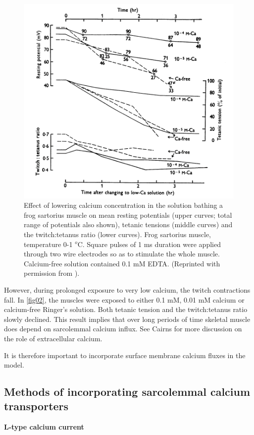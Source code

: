 \documentclass[fleqn,10pt]{physiome}
\begin{document}
\begin{figure}[ht!]
\centering
\includegraphics[width=0.7\linewidth]{fig02}
\caption{Effect of lowering calcium concentration in the solution bathing a frog sartorius muscle on mean resting potentials (upper curves; total range of potentials also shown), tetanic tensions (middle curves) and the twitch:tetanus ratio (lower curves). Frog sartorius muscle, temperature 0-1 $^{o}$C. Square pulses of 1 ms duration were applied through two wire electrodes so as to stimulate the whole muscle. Calcium-free solution contained 0.1 mM EDTA. 
(Reprinted with permission from \citet{edman1964role}).
}
\label{fig02}
\end{figure}

However, during prolonged exposure to very low calcium, the twitch contractions fall. In \autoref{fig02}, the muscles were exposed to either 0.1 mM, 0.01 mM calcium or calcium-free Ringer’s solution. Both tetanic tension and the twitch:tetanus ratio slowly declined. This result implies that over long periods of time skeletal muscle does depend on sarcolemmal calcium influx. See Cairns \citep{cairns2003changes,cairns2008multiple} for more discussion on the role of extracellular calcium. 

It is therefore important to incorporate surface membrane calcium fluxes in the \citet{shorten2007mathematical} model. 


\subsection{Methods of incorporating sarcolemmal calcium transporters}

\textbf{L-type calcium current}\newline
\end{document}
